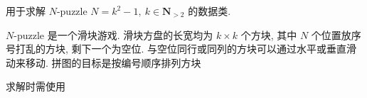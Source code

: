 用于求解 \(N\)-puzzle \(N=k^2-1,~k\in\mathbf{N}_{>2}\) 的数据类.

\(N\)-puzzle 是一个滑块游戏. 滑块方盘的长宽均为 \(k\times k\) 个方块, 其中 \(N\) 个位置放序号打乱的方块, 剩下一个为空位. 与空位同行或同列的方块可以通过水平或垂直滑动来移动. 拼图的目标是按编号顺序排列方块

求解时需使用 

\inputminted{cpp}{src/src/npuzzle_data_usage.txt}
